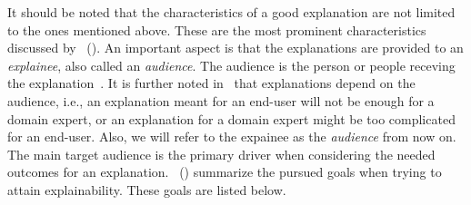 It should be noted that the characteristics of a good explanation are not limited to the ones mentioned above. These are the most prominent characteristics discussed by~\citeauthor{ExplanationInAI_Miller} (\citeyear{ExplanationInAI_Miller}). An important aspect is that the explanations are provided to an \emph{explainee}, also called an \emph{audience}. The audience is the person or people receving the explanation~\parencite{XAIConceptsTaxonomies_Arrieta}. It is further noted in~\parencite{XAIConceptsTaxonomies_Arrieta} that explanations depend on the audience, i.e., an explanation meant for an end-user will not be enough for a domain expert, or an explanation for a domain expert might be too complicated for an end-user. Also, we will refer to the expainee as the \emph{audience} from now on.\\
The main target audience is the primary driver when considering the needed outcomes for an explanation.~\citeauthor{XAIConceptsTaxonomies_Arrieta} (\citeyear{XAIConceptsTaxonomies_Arrieta}) summarize the pursued goals when trying to attain explainability. These goals are listed below.
